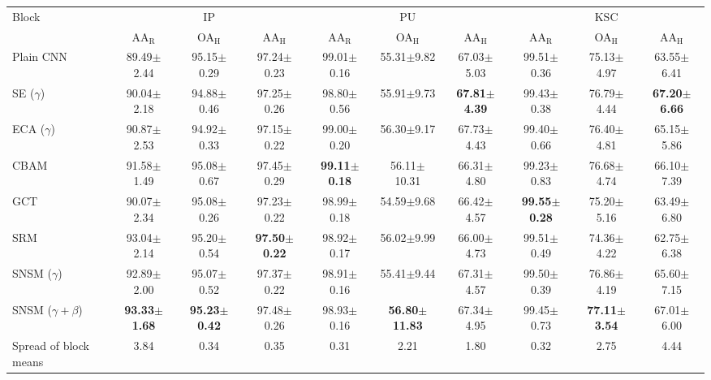 \begin{tabular}{lccccccccc}
\toprule
Block & \multicolumn{3}{c}{IP} & \multicolumn{3}{c}{PU} & \multicolumn{3}{c}{KSC} \\
 & AA$_\mathrm{R}$ & OA$_\mathrm{H}$ & AA$_\mathrm{H}$ & AA$_\mathrm{R}$ & OA$_\mathrm{H}$ & AA$_\mathrm{H}$ & AA$_\mathrm{R}$ & OA$_\mathrm{H}$ & AA$_\mathrm{H}$ \\
\midrule
Plain CNN & 89.49$\pm$2.44 & 95.15$\pm$0.29 & 97.24$\pm$0.23 & 99.01$\pm$0.16 & 55.31$\pm$9.82 & 67.03$\pm$5.03 & 99.51$\pm$0.36 & 75.13$\pm$4.97 & 63.55$\pm$6.41 \\
SE ($\gamma$) & 90.04$\pm$2.18 & 94.88$\pm$0.46 & 97.25$\pm$0.26 & 98.80$\pm$0.56 & 55.91$\pm$9.73 & \textbf{67.81$\pm$4.39} & 99.43$\pm$0.38 & 76.79$\pm$4.44 & \textbf{67.20$\pm$6.66} \\
ECA ($\gamma$) & 90.87$\pm$2.53 & 94.92$\pm$0.33 & 97.15$\pm$0.22 & 99.00$\pm$0.20 & 56.30$\pm$9.17 & 67.73$\pm$4.43 & 99.40$\pm$0.66 & 76.40$\pm$4.81 & 65.15$\pm$5.86 \\
CBAM & 91.58$\pm$1.49 & 95.08$\pm$0.67 & 97.45$\pm$0.29 & \textbf{99.11$\pm$0.18} & 56.11$\pm$10.31 & 66.31$\pm$4.80 & 99.23$\pm$0.83 & 76.68$\pm$4.74 & 66.10$\pm$7.39 \\
GCT & 90.07$\pm$2.34 & 95.08$\pm$0.26 & 97.23$\pm$0.22 & 98.99$\pm$0.18 & 54.59$\pm$9.68 & 66.42$\pm$4.57 & \textbf{99.55$\pm$0.28} & 75.20$\pm$5.16 & 63.49$\pm$6.80 \\
SRM & 93.04$\pm$2.14 & 95.20$\pm$0.54 & \textbf{97.50$\pm$0.22} & 98.92$\pm$0.17 & 56.02$\pm$9.99 & 66.00$\pm$4.73 & 99.51$\pm$0.49 & 74.36$\pm$4.22 & 62.75$\pm$6.38 \\
SNSM ($\gamma$) & 92.89$\pm$2.00 & 95.07$\pm$0.52 & 97.37$\pm$0.22 & 98.91$\pm$0.16 & 55.41$\pm$9.44 & 67.31$\pm$4.57 & 99.50$\pm$0.39 & 76.86$\pm$4.19 & 65.60$\pm$7.15 \\
SNSM ($\gamma{+}\beta$) & \textbf{93.33$\pm$1.68} & \textbf{95.23$\pm$0.42} & 97.48$\pm$0.26 & 98.93$\pm$0.16 & \textbf{56.80$\pm$11.83} & 67.34$\pm$4.95 & 99.45$\pm$0.73 & \textbf{77.11$\pm$3.54} & 67.01$\pm$6.00 \\
\midrule
Spread of block means & 3.84 & 0.34 & 0.35 & 0.31 & 2.21 & 1.80 & 0.32 & 2.75 & 4.44 \\
\bottomrule
\end{tabular}
